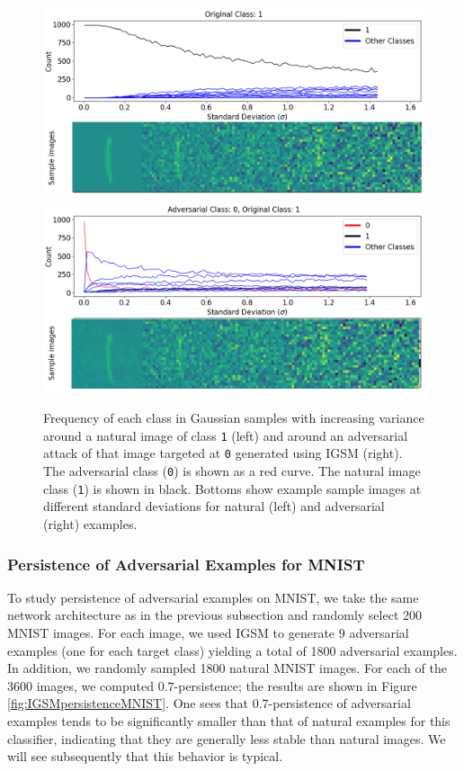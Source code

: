 \begin{figure}[!ht]
  \includegraphics[width = .49\textwidth]{c3_figures/MNIST1.png}
  \includegraphics[width = .49\textwidth]{c3_figures/MNIST10.png}
\caption{Frequency of each class in Gaussian samples with increasing variance around a natural image of class \texttt{1} (left) and around an adversarial attack of that image targeted at \texttt{0} generated using IGSM (right). The adversarial class (\texttt{0}) is shown as a red curve. The natural image class (\texttt{1}) is shown in black. Bottoms show example sample images at different standard deviations for natural (left) and adversarial (right) examples.}\label{fgsmo}
\end{figure}

\subsubsection{Persistence of Adversarial Examples for MNIST}

To study persistence of adversarial examples on MNIST, we take the same network architecture as in the previous subsection and randomly select 200 MNIST images. For each image, we used IGSM to generate 9 adversarial examples (one for each target class) yielding a total of 1800 adversarial examples. In addition, we randomly sampled 1800 natural MNIST images. For each of the 3600 images, we computed $0.7$-persistence; the results are shown in Figure \ref{fig:IGSMpersistenceMNIST}. One sees that $0.7$-persistence of adversarial examples tends to be significantly smaller than that of natural examples for this classifier, indicating that they are generally less stable than natural images. We will see subsequently that this behavior is typical.

